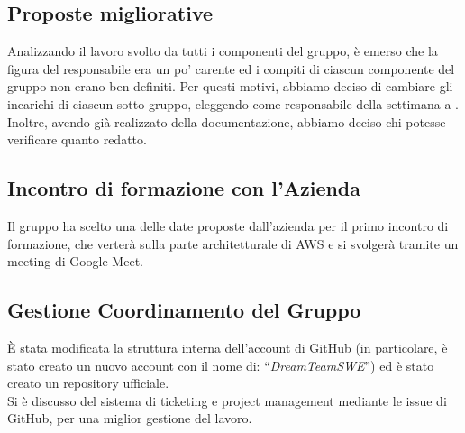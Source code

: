 \subsection{Proposte migliorative}

Analizzando il lavoro svolto da tutti i componenti del gruppo, è emerso che la figura del responsabile era un po' carente ed i compiti di ciascun componente del gruppo non erano ben definiti. Per questi motivi, abbiamo deciso di cambiare gli incarichi di ciascun sotto-gruppo, eleggendo come responsabile della settimana a \FP{}. Inoltre, avendo già realizzato della documentazione, abbiamo deciso chi potesse verificare quanto redatto. 

\subsection{Incontro di formazione con l'Azienda}

Il gruppo ha scelto una delle date proposte dall'azienda per il primo incontro di formazione, che verterà sulla parte architetturale di AWS e si svolgerà tramite un meeting di Google Meet.

\subsection{Gestione Coordinamento del Gruppo}

È stata modificata la struttura interna dell'account di GitHub (in particolare, è stato creato un nuovo account con il nome di: “\textit{DreamTeamSWE}”) ed è stato creato un repository ufficiale. \\
Si è discusso del sistema di ticketing e project management mediante le issue di GitHub, per una miglior gestione del lavoro.   